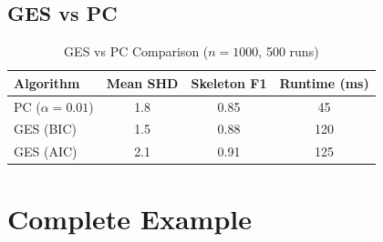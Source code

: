 \subsection{GES vs PC}

\begin{table}[h]
\centering
\caption{GES vs PC Comparison ($n=1000$, 500 runs)}
\begin{tabular}{lccc}
\toprule
Algorithm & Mean SHD & Skeleton F1 & Runtime (ms) \\
\midrule
PC ($\alpha=0.01$) & 1.8 & 0.85 & 45 \\
GES (BIC) & 1.5 & 0.88 & 120 \\
GES (AIC) & 2.1 & 0.91 & 125 \\
\bottomrule
\end{tabular}
\end{table}


\section{Complete Example}

